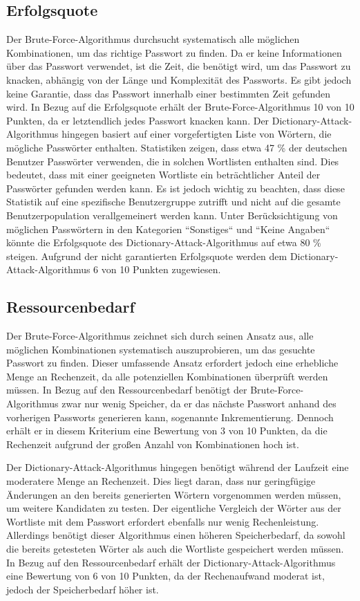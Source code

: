 \subsection{Erfolgsquote}
Der Brute-Force-Algorithmus durchsucht systematisch alle möglichen Kombinationen, um das richtige Passwort zu finden. 
Da er keine Informationen über das Passwort verwendet, ist die Zeit, die benötigt wird, um das Passwort zu knacken, abhängig von der Länge und Komplexität des Passworts. 
Es gibt jedoch keine Garantie, dass das Passwort innerhalb einer bestimmten Zeit gefunden wird. 
In Bezug auf die Erfolgsquote erhält der Brute-Force-Algorithmus 10 von 10 Punkten, da er letztendlich jedes Passwort knacken kann.
Der Dictionary-Attack-Algorithmus hingegen basiert auf einer vorgefertigten Liste von Wörtern, die mögliche Passwörter enthalten. 
Statistiken zeigen, dass etwa 47 \% der deutschen Benutzer Passwörter verwenden, die in solchen Wortlisten enthalten sind. 
Dies bedeutet, dass mit einer geeigneten Wortliste ein beträchtlicher Anteil der Passwörter gefunden werden kann. 
Es ist jedoch wichtig zu beachten, dass diese Statistik auf eine spezifische Benutzergruppe zutrifft und nicht auf die gesamte Benutzerpopulation verallgemeinert werden kann. 
Unter Berücksichtigung von möglichen Passwörtern in den Kategorien ``Sonstiges`` und ``Keine Angaben`` könnte die Erfolgsquote des Dictionary-Attack-Algorithmus auf etwa 80 \% steigen. 
Aufgrund der nicht garantierten Erfolgsquote werden dem Dictionary-Attack-Algorithmus 6 von 10 Punkten zugewiesen.
\subsection{Ressourcenbedarf}
Der Brute-Force-Algorithmus zeichnet sich durch seinen Ansatz aus, alle möglichen Kombinationen systematisch auszuprobieren, um das gesuchte Passwort zu finden. 
Dieser umfassende Ansatz erfordert jedoch eine erhebliche Menge an Rechenzeit, da alle potenziellen Kombinationen überprüft werden müssen. 
In Bezug auf den Ressourcenbedarf benötigt der Brute-Force-Algorithmus zwar nur wenig Speicher, da er das nächste Passwort anhand des vorherigen Passworts generieren kann, sogenannte Inkrementierung. 
Dennoch erhält er in diesem Kriterium eine Bewertung von 3 von 10 Punkten, da die Rechenzeit aufgrund der großen Anzahl von Kombinationen hoch ist.

Der Dictionary-Attack-Algorithmus hingegen benötigt während der Laufzeit eine moderatere Menge an Rechenzeit. 
Dies liegt daran, dass nur geringfügige Änderungen an den bereits generierten Wörtern vorgenommen werden müssen, um weitere Kandidaten zu testen. 
Der eigentliche Vergleich der Wörter aus der Wortliste mit dem Passwort erfordert ebenfalls nur wenig Rechenleistung. 
Allerdings benötigt dieser Algorithmus einen höheren Speicherbedarf, da sowohl die bereits getesteten Wörter als auch die Wortliste gespeichert werden müssen. 
In Bezug auf den Ressourcenbedarf erhält der Dictionary-Attack-Algorithmus eine Bewertung von 6 von 10 Punkten, da der Rechenaufwand moderat ist, jedoch der Speicherbedarf höher ist.
